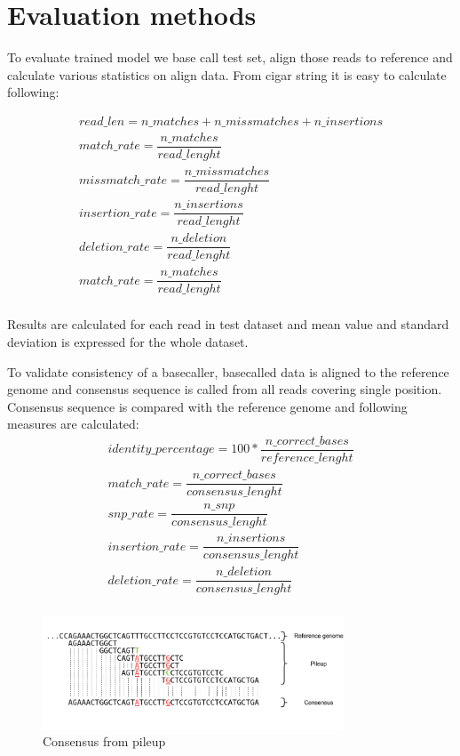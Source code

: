 \documentclass[times, utf8, diplomski, english]{fer}
\begin{document}
\section{Evaluation methods}
To evaluate trained model we base call test set, align those reads to reference and calculate various statistics on align data.
From cigar string it is easy to calculate following:

\begin{gather*}
read\_len =  n\_matches + n\_missmatches + n\_insertions \\
match\_rate = \dfrac{n\_matches}{read\_lenght} \\
missmatch\_rate = \dfrac{n\_missmatches}{read\_lenght}\\
insertion\_rate = \dfrac{n\_insertions}{read\_lenght}\\
deletion\_rate = \dfrac{n\_deletion}{read\_lenght}\\
match\_rate = \dfrac{n\_matches}{read\_lenght}\\
\end{gather*}

Results are calculated for each read in test dataset and mean value and standard deviation is expressed for the whole dataset.

To validate consistency of a basecaller, basecalled data is aligned to the reference genome and consensus sequence is called from all reads covering single position. Consensus sequence is compared with the reference genome and following measures are calculated:
\begin{gather*}
identity\_percentage =  100 * \dfrac{n\_correct\_bases}{reference\_lenght} \\
match\_rate = \dfrac{n\_correct\_bases}{consensus\_lenght} \\
snp\_rate = \dfrac{n\_snp}{consensus\_lenght}\\
insertion\_rate = \dfrac{n\_insertions}{consensus\_lenght}\\
deletion\_rate = \dfrac{n\_deletion}{consensus\_lenght}\\
\end{gather*}

\begin{figure}[!ht]
	\begin{center}
		\includegraphics[width=0.8\textwidth]{./imgs/consnesus.png}
		\caption{Consensus from pileup}
		\label{fg:consensus}
	\end{center}
\end{figure}
\end{document}
